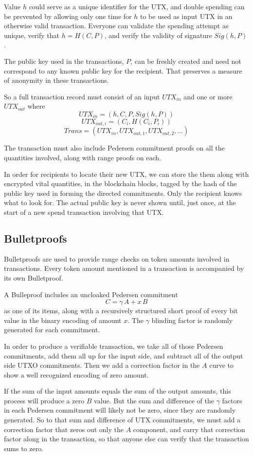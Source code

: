 \documentclass{yellowpaper}
\begin{document}
Value $h$ could serve as a unique identifier for the UTX, and double spending can be prevented by allowing only one time for $h$ to be used as input UTX in an otherwise valid transaction. Everyone can validate the spending attempt as unique, verify that $h = H(C, P)$, and verify the validity of signature $Sig(h, P)$.

The public key used in the transactions, $P$, can be freshly created and need not correspond to any known public key for the recipient. That preserves a measure of anonymity in these transactions.

So a full transaction record must consist of an input $UTX_{in}$ and one or more $UTX_{out}$ where
$$UTX_{in} = (h, C, P, Sig(h, P))$$
$$UTX_{out, i} = (C_i, H(C_i, P_i))$$
$$Trans = (UTX_{in}, UTX_{out,1}, UTX_{out,2}, ...)$$

The transaction must also include Pedersen commitment proofs on all the quantities involved, along with range proofs on each.

In order for recipients to locate their new UTX, we can store the them along with encrypted vital quantities, in the blockchain blocks, tagged by the hash of the public key used in forming the directed commitments. Only the recipient knows what to look for. The actual public key is never shown until, just once, at the start of a new spend transaction involving that UTX.

\subsection{Bulletproofs}

Bulletproofs are used to provide range checks on token amounts involved in transactions. Every token amount mentioned in a transaction is accompanied by its own Bulletproof. 

A Bulleproof includes an uncloaked Pedersen commitment 
$$C = \gamma \, A + x \, B$$
 as one of its items, along with a recursively structured short proof of every bit value in the binary encoding of amount $x$. The $\gamma$ blinding factor is randomly generated for each commitment.

In order to produce a verifiable transaction, we take all of those Pedersen commitments, add them all up for the input side, and subtract all of the output side UTXO commitments. Then we add a correction factor in the $A$ curve to show a well recognized encoding of zero amount. 

If the sum of the input amounts equals the sum of the output amounts, this process will produce a zero $B$ value. But the sum and difference of the $\gamma$ factors in each Pedersen commitment will likely not be zero, since they are randomly generated. So to that sum and difference of UTX commitments, we must add a correction factor that zeros out only the $A$ component, and carry that correction factor along in the transaction, so that anyone else can verify that the transaction sums to zero.
\end{document}
